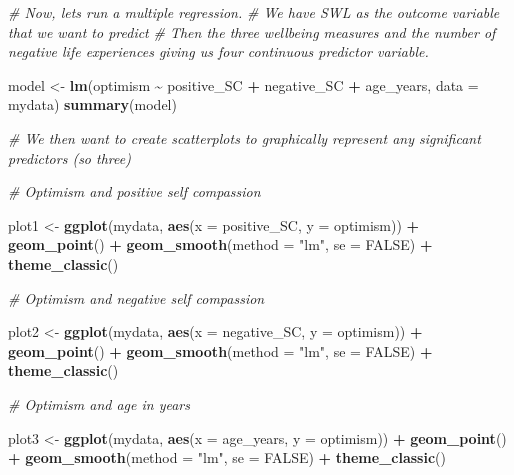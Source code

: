 \documentclass[
]{book}
\newenvironment{Shaded}{\begin{snugshade}}{\end{snugshade}}
\newcommand{\AttributeTok}[1]{\textcolor[rgb]{0.13,0.29,0.53}{#1}}
\newcommand{\CommentTok}[1]{\textcolor[rgb]{0.56,0.35,0.01}{\textit{#1}}}
\newcommand{\ConstantTok}[1]{\textcolor[rgb]{0.56,0.35,0.01}{#1}}
\newcommand{\FunctionTok}[1]{\textcolor[rgb]{0.13,0.29,0.53}{\textbf{#1}}}
\newcommand{\NormalTok}[1]{#1}
\newcommand{\OtherTok}[1]{\textcolor[rgb]{0.56,0.35,0.01}{#1}}
\newcommand{\SpecialCharTok}[1]{\textcolor[rgb]{0.81,0.36,0.00}{\textbf{#1}}}
\newcommand{\StringTok}[1]{\textcolor[rgb]{0.31,0.60,0.02}{#1}}
\begin{document}
\begin{Shaded}
\begin{Highlighting}[]
\CommentTok{\# Now, let\textquotesingle{}s run a multiple regression.}
\CommentTok{\# We have SWL as the outcome variable that we want to predict}
\CommentTok{\# Then the three wellbeing measures and the number of negative life experiences giving us four continuous predictor variable.}

\NormalTok{model }\OtherTok{\textless{}{-}} \FunctionTok{lm}\NormalTok{(optimism }\SpecialCharTok{\textasciitilde{}}\NormalTok{ positive\_SC }\SpecialCharTok{+}\NormalTok{ negative\_SC }\SpecialCharTok{+}\NormalTok{ age\_years, }\AttributeTok{data =}\NormalTok{ mydata)}
\FunctionTok{summary}\NormalTok{(model)}

\CommentTok{\# We then want to create scatterplots to graphically represent any significant predictors (so three)}

\CommentTok{\# Optimism and positive self compassion}

\NormalTok{plot1 }\OtherTok{\textless{}{-}} \FunctionTok{ggplot}\NormalTok{(mydata, }\FunctionTok{aes}\NormalTok{(}\AttributeTok{x =}\NormalTok{ positive\_SC, }\AttributeTok{y =}\NormalTok{ optimism)) }\SpecialCharTok{+}
  \FunctionTok{geom\_point}\NormalTok{() }\SpecialCharTok{+}
  \FunctionTok{geom\_smooth}\NormalTok{(}\AttributeTok{method =} \StringTok{"lm"}\NormalTok{,}
              \AttributeTok{se =} \ConstantTok{FALSE}\NormalTok{) }\SpecialCharTok{+}
  \FunctionTok{theme\_classic}\NormalTok{()}

\CommentTok{\# Optimism and negative self compassion}

\NormalTok{plot2 }\OtherTok{\textless{}{-}} \FunctionTok{ggplot}\NormalTok{(mydata, }\FunctionTok{aes}\NormalTok{(}\AttributeTok{x =}\NormalTok{ negative\_SC, }\AttributeTok{y =}\NormalTok{ optimism)) }\SpecialCharTok{+}
  \FunctionTok{geom\_point}\NormalTok{() }\SpecialCharTok{+}
  \FunctionTok{geom\_smooth}\NormalTok{(}\AttributeTok{method =} \StringTok{"lm"}\NormalTok{,}
              \AttributeTok{se =} \ConstantTok{FALSE}\NormalTok{) }\SpecialCharTok{+}
  \FunctionTok{theme\_classic}\NormalTok{()}

\CommentTok{\# Optimism and age in years}

\NormalTok{plot3 }\OtherTok{\textless{}{-}} \FunctionTok{ggplot}\NormalTok{(mydata, }\FunctionTok{aes}\NormalTok{(}\AttributeTok{x =}\NormalTok{ age\_years, }\AttributeTok{y =}\NormalTok{ optimism)) }\SpecialCharTok{+}
  \FunctionTok{geom\_point}\NormalTok{() }\SpecialCharTok{+}
  \FunctionTok{geom\_smooth}\NormalTok{(}\AttributeTok{method =} \StringTok{"lm"}\NormalTok{,}
              \AttributeTok{se =} \ConstantTok{FALSE}\NormalTok{) }\SpecialCharTok{+}
  \FunctionTok{theme\_classic}\NormalTok{()}


\end{Highlighting}
\end{Shaded}
\end{document}
